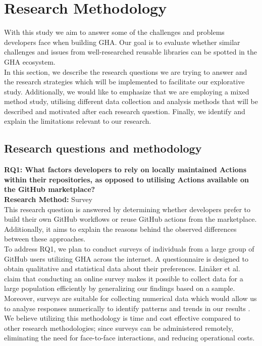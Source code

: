 \documentclass[conference]{IEEEtran}
\begin{document}
\section{Research Methodology}
    With this study we aim to answer some of the challenges and problems developers face when building GHA. Our goal is to evaluate whether similar challenges and issues from well-researched reusable libraries can be spotted in the GHA ecosystem.\\

    In this section, we describe the research questions we are trying to answer and the research strategies which will be implemented to facilitate our explorative study. Additionally, we would like to emphasize that we are employing a mixed method study, utilising different data collection and analysis methods that will be described and motivated after each research question. Finally, we identify and explain the limitations relevant to our research.

    \subsection{Research questions and methodology}


        \textbf{RQ1: What factors developers to rely on locally maintained Actions within their repositories, as opposed to utilising Actions available on the GitHub marketplace?}\\

        \textbf{Research Method:} Survey\\
            
        This research question is answered by determining whether developers prefer to build their own GitHub workflows or reuse GitHub actions from the marketplace. Additionally, it aims to explain the reasons behind the observed differences between these approaches.\\

        To address RQ1, we plan to conduct surveys of individuals from a large group of GitHub users utilizing GHA across the internet. A questionnaire is designed to obtain qualitative and statistical data about their preferences. Linåker et al. \cite{linaker2013guidelines} claim that conducting an online survey makes it possible to collect data for a large population efficiently by generalizing our findings based on a sample. Moreover, surveys are suitable for collecting numerical data which would allow us to analyse responses numerically to identify patterns and trends in our results \cite{fowler2009survey}. We believe utilizing this methodology is time and cost effective compared to other research methodologies; since surveys can be administered remotely, eliminating the need for face-to-face interactions, and reducing operational costs.\\
\end{document}
